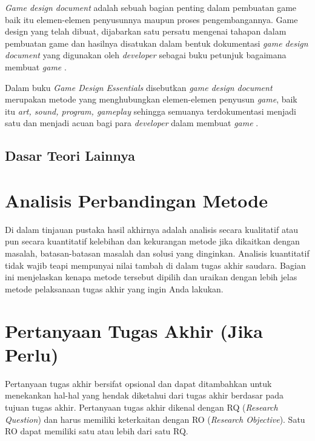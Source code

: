 \textit{Game design document} adalah sebuah bagian penting dalam pembuatan game baik itu elemen-elemen penyusunnya maupun proses pengembangannya. Game design yang telah dibuat, dijabarkan satu persatu mengenai tahapan dalam pembuatan game dan hasilnya disatukan dalam bentuk dokumentasi \textit{game design document} yang digunakan oleh \textit{developer} sebagai buku petunjuk bagaimana membuat \textit{game} \cite{lukito2016}.

Dalam buku \textit{Game Design Essentials} disebutkan \textit{game design document} merupakan metode yang menghubungkan elemen-elemen penyusun \textit{game}, baik itu \textit{art, sound, program, 
gameplay} sehingga semuanya terdokumentasi menjadi satu dan menjadi acuan bagi para \textit{developer} dalam membuat \textit{game} \cite{wibirama2013dual}. 

\subsection{Dasar Teori Lainnya}

\section{Analisis Perbandingan Metode}

Di dalam tinjauan pustaka hasil akhirnya adalah analisis secara kualitatif atau pun secara kuantitatif kelebihan dan kekurangan metode jika dikaitkan dengan masalah, batasan-batasan masalah dan solusi yang dinginkan. Analisis kuantitatif tidak wajib teapi mempunyai nilai tambah di dalam tugas akhir saudara. Bagian ini menjelaskan kenapa metode tersebut dipilih dan uraikan dengan lebih jelas metode pelaksanaan tugas akhir yang ingin Anda lakukan. 

\section{Pertanyaan Tugas Akhir (Jika Perlu)}

Pertanyaan tugas akhir bersifat opsional dan dapat ditambahkan untuk menekankan hal-hal yang hendak diketahui dari tugas akhir berdasar pada tujuan tugas akhir. Pertanyaan tugas akhir dikenal dengan RQ (\textit{Research Question}) dan harus memiliki keterkaitan dengan RO (\textit{Research Objective}). Satu RO dapat memiliki satu atau lebih dari satu RQ. 

